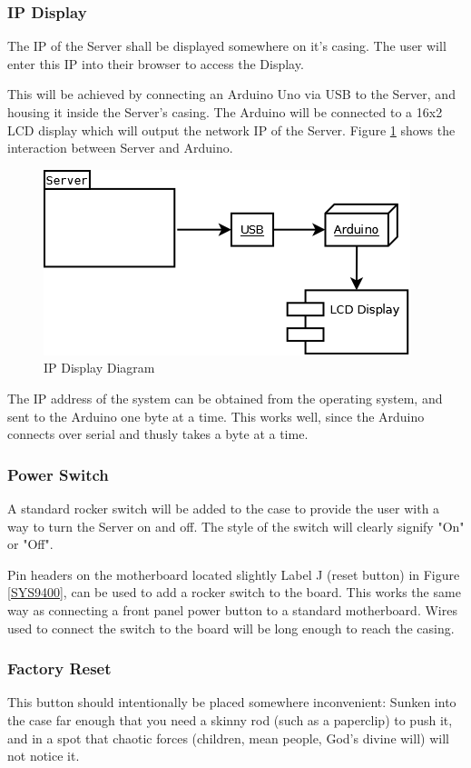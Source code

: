 \subsubsection{\ac{IP} Display}
The \ac{IP} of the Server shall be displayed somewhere on it's casing. 
The user will enter this \ac{IP} into their browser to access the Display.

This will be achieved by connecting an Arduino Uno via \ac{USB} to the Server, and housing it inside the Server's casing. 
The Arduino will be connected to a 16x2 \ac{LCD} display which will output the network \ac{IP} of the Server. 
Figure \ref{ArduinoLCD} shows the interaction between Server and Arduino.

\begin{figure}
\centering
\includegraphics[scale=0.5]{Hardware/images/ArduinoLCD.png}
\caption{\ac{IP} Display Diagram}
\label{ArduinoLCD}
\end{figure}

The \ac{IP} address of the system can be obtained from the operating system, and sent to the Arduino one byte at a time. 
This works well, since the Arduino connects over serial and thusly takes a byte at a time.


\subsubsection{Power Switch}
A standard rocker switch will be added to the case to provide the user with a way to turn the Server on and off. 
The style of the switch will clearly signify "On" or "Off".

Pin headers on the motherboard located slightly Label J (reset button) in Figure \ref{SYS9400}, can be used to add a rocker switch to the board.
This works the same way as connecting a front panel power button to a standard motherboard.
Wires used to connect the switch to the board will be long enough to reach the casing.


\subsubsection{Factory Reset}
This button should intentionally be placed somewhere inconvenient: 
Sunken into the case far enough that you need a skinny rod (such as a paperclip) to push it, and in a spot
that chaotic forces (children, mean people, God's divine will) will not notice it. 

